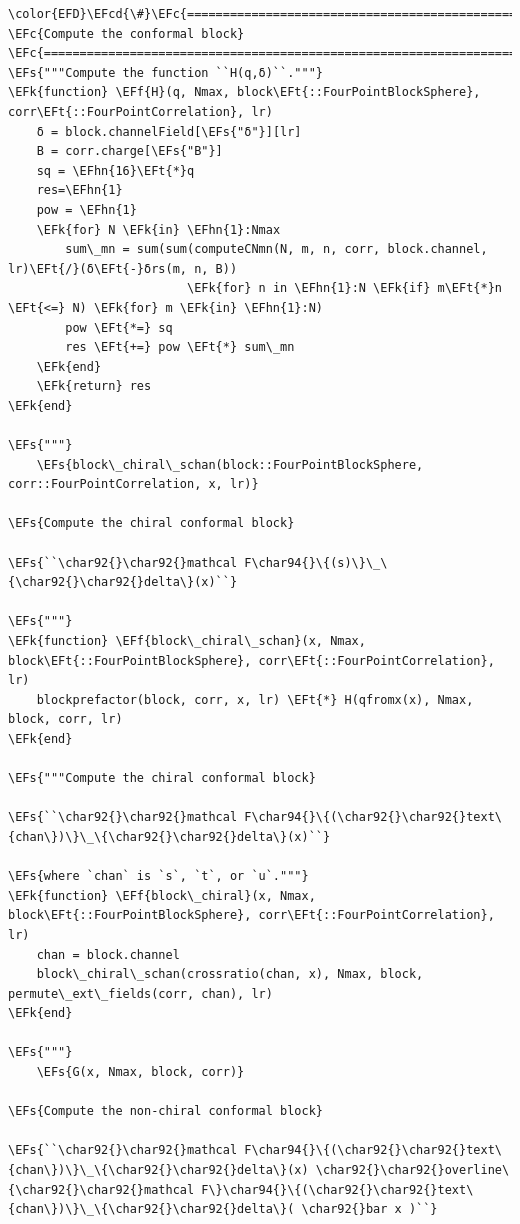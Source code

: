 \documentclass[a4paper]{article}
\numberwithin{equation}{section}
\newcommand{\EFc}[1]{\textcolor{EFc}{#1}} %
\newcommand{\EFcd}[1]{\textcolor{EFcd}{#1}} %
\newcommand{\EFs}[1]{\textcolor{EFs}{#1}} %
\newcommand{\EFk}[1]{\textcolor{EFk}{#1}} %
\newcommand{\EFf}[1]{\textcolor{EFf}{#1}} %
\newcommand{\EFt}[1]{\textcolor{EFt}{#1}} %
\newcommand{\EFhn}[1]{\textcolor{EFhn}{#1}} %
\begin{document}
\begin{Code}
\begin{Verbatim}
\color{EFD}\EFcd{\#}\EFc{===========================================================================================}
\EFc{Compute the conformal block}
\EFc{===========================================================================================\#}
\EFs{"""Compute the function ``H(q,δ)``."""}
\EFk{function} \EFf{H}(q, Nmax, block\EFt{::FourPointBlockSphere}, corr\EFt{::FourPointCorrelation}, lr)
    δ = block.channelField[\EFs{"δ"}][lr]
    B = corr.charge[\EFs{"B"}]
    sq = \EFhn{16}\EFt{*}q
    res=\EFhn{1}
    pow = \EFhn{1}
    \EFk{for} N \EFk{in} \EFhn{1}:Nmax
        sum\_mn = sum(sum(computeCNmn(N, m, n, corr, block.channel, lr)\EFt{/}(δ\EFt{-}δrs(m, n, B))
                         \EFk{for} n in \EFhn{1}:N \EFk{if} m\EFt{*}n \EFt{<=} N) \EFk{for} m \EFk{in} \EFhn{1}:N)
        pow \EFt{*=} sq
        res \EFt{+=} pow \EFt{*} sum\_mn
    \EFk{end}
    \EFk{return} res
\EFk{end}

\EFs{"""}
    \EFs{block\_chiral\_schan(block::FourPointBlockSphere, corr::FourPointCorrelation, x, lr)}

\EFs{Compute the chiral conformal block}

\EFs{``\char92{}\char92{}mathcal F\char94{}\{(s)\}\_\{\char92{}\char92{}delta\}(x)``}

\EFs{"""}
\EFk{function} \EFf{block\_chiral\_schan}(x, Nmax, block\EFt{::FourPointBlockSphere}, corr\EFt{::FourPointCorrelation}, lr)
    blockprefactor(block, corr, x, lr) \EFt{*} H(qfromx(x), Nmax, block, corr, lr)
\EFk{end}

\EFs{"""Compute the chiral conformal block}

\EFs{``\char92{}\char92{}mathcal F\char94{}\{(\char92{}\char92{}text\{chan\})\}\_\{\char92{}\char92{}delta\}(x)``}

\EFs{where `chan` is `s`, `t`, or `u`."""}
\EFk{function} \EFf{block\_chiral}(x, Nmax, block\EFt{::FourPointBlockSphere}, corr\EFt{::FourPointCorrelation}, lr)
    chan = block.channel
    block\_chiral\_schan(crossratio(chan, x), Nmax, block, permute\_ext\_fields(corr, chan), lr)
\EFk{end}

\EFs{"""}
    \EFs{G(x, Nmax, block, corr)}

\EFs{Compute the non-chiral conformal block}

\EFs{``\char92{}\char92{}mathcal F\char94{}\{(\char92{}\char92{}text\{chan\})\}\_\{\char92{}\char92{}delta\}(x) \char92{}\char92{}overline\{\char92{}\char92{}mathcal F\}\char94{}\{(\char92{}\char92{}text\{chan\})\}\_\{\char92{}\char92{}delta\}( \char92{}bar x )``}


\end{Verbatim}
\end{Code}
\end{document}

